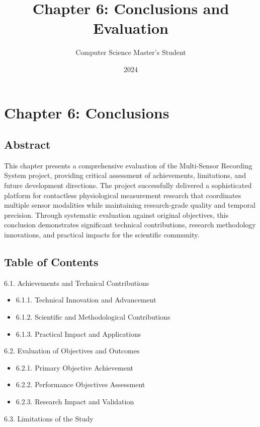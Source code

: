 \documentclass[11pt,a4paper]{article}
\title{Chapter 6: Conclusions and Evaluation}
\author{Computer Science Master's Student}
\date{2024}
\begin{document}
\maketitle

\section{Chapter 6: Conclusions}

\subsection{Abstract}

This chapter presents a comprehensive evaluation of the Multi-Sensor Recording System project, providing critical
assessment of achievements, limitations, and future development directions. The project successfully delivered a
sophisticated platform for contactless physiological measurement research that coordinates multiple sensor modalities
while maintaining research-grade quality and temporal precision. Through systematic evaluation against original
objectives, this conclusion demonstrates significant technical contributions, research methodology innovations, and
practical impacts for the scientific community.

\subsection{Table of Contents}

6.1. Achievements and Technical Contributions

\begin{itemize}
\item 6.1.1. Technical Innovation and Advancement
\item 6.1.2. Scientific and Methodological Contributions
\item 6.1.3. Practical Impact and Applications

\end{itemize}
6.2. Evaluation of Objectives and Outcomes

\begin{itemize}
\item 6.2.1. Primary Objective Achievement
\item 6.2.2. Performance Objectives Assessment
\item 6.2.3. Research Impact and Validation

\end{itemize}
6.3. Limitations of the Study
\end{document}
